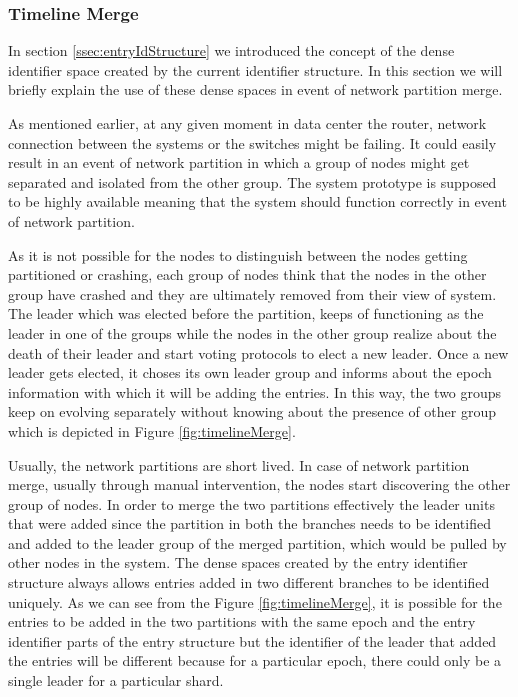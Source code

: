 \documentclass[12pt,a4paper,twoside,openright]{book}
\begin{document}
\subsubsection{Timeline Merge}
In section \ref{ssec:entryIdStructure} we introduced the concept of the dense identifier space created by the current identifier structure. In this section we will briefly explain the use of these dense spaces in event of network partition merge. 


\par As mentioned earlier, at any given moment in data center the router, network connection between the systems or the switches might be failing. It could easily result in an event of network partition in which a group of nodes might get separated and isolated from the other group. The system prototype is supposed to be highly available meaning that the system should function correctly in event of network partition. 

\par As it is not possible for the nodes to distinguish between the nodes getting partitioned or crashing, each group of nodes think that the nodes in the other group have crashed and they are ultimately removed from their view of system. The leader which was elected before the partition, keeps of functioning as the leader in one of the groups while the nodes in the other group realize about the death of their leader and start voting protocols to elect a new leader. Once a new leader gets elected, it choses its own leader group and informs about the epoch information with which it will be adding the entries. In this way, the two groups keep on evolving separately without knowing about the presence of other group which is depicted in Figure \ref{fig:timelineMerge}.

\par Usually, the network partitions are short lived. In case of network partition merge, usually through manual intervention, the nodes start discovering the other group of nodes. In order to merge the two partitions effectively the leader units that were added since the partition in both the branches needs to be identified and added to the leader group of the merged partition, which would be pulled by other nodes in the system. The dense spaces created by the entry identifier structure always allows entries added in two different branches to be identified uniquely. As we can see from the Figure \ref{fig:timelineMerge}, it is possible for the entries to be added in the two partitions with the same epoch and the entry identifier parts of the entry structure but the identifier of the leader that added the entries will be different because for a particular epoch, there could only be a single leader for a particular shard.
\end{document}
